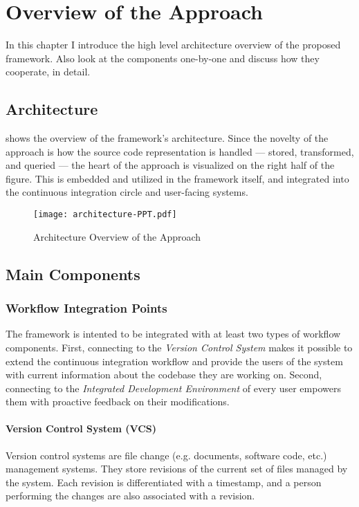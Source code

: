 \chapter{Overview of the Approach}
\label{chap:overview-of-the-approach}

In this chapter I introduce the high level architecture overview of the proposed framework. Also look at the components one-by-one and discuss how they cooperate, in detail.

\section{Architecture}
\label{sect:architecture}
 shows the overview of the framework's architecture. Since the novelty of the approach is how the source code representation is handled --- stored, transformed, and queried --- the heart of the approach is visualized on the right half of the figure. This is embedded and utilized in the framework itself, and integrated into the continuous integration circle and user-facing systems.

\begin{figure}[!htb]
  \centering
  \texttt{[image: architecture-PPT.pdf]}
  \caption{Architecture Overview of the Approach}
  \label{fig:architecture-overview}
\end{figure}


\section{Main Components}

\subsection{Workflow Integration Points}
The framework is intented to be integrated with at least two types of workflow components. First, connecting to the \emph{Version Control System} makes it possible to extend the continuous integration workflow and provide the users of the system with current information about the codebase they are working on. Second, connecting to the \emph{Integrated Development Environment} of every user empowers them with proactive feedback on their modifications.

\subsubsection{Version Control System (VCS)}
Version control systems are file change (e.g. documents, software code, etc.) management systems. They store revisions of the current set of files managed by the system. Each revision is differentiated with a timestamp, and a person performing the changes are also associated with a revision.


